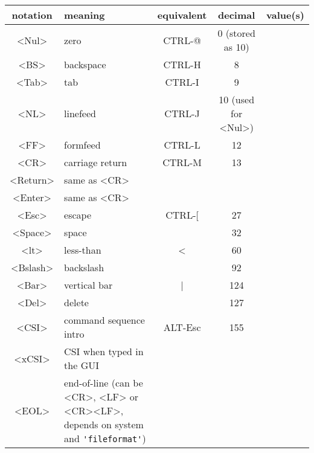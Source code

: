 \begin{description}
\begin{tabularx}{\textwidth}{|c|X|c|c|c|} %
				\hline
				notation & meaning                   & equivalent & decimal             & value(s)\\ \hline
				<Nul>    & zero                      & CTRL-@     & 0 (stored as 10)    & \label{<Nul>}\\
				<BS>     & backspace                 & CTRL-H     & 8                   & \label{backspace}\\
				<Tab>    & tab                       & CTRL-I     & 9                   & \label{tab} \label{Tab}\\
				<NL>     & linefeed                  & CTRL-J     & 10 (used for <Nul>) & \label{linefeed}\\
				<FF>     & formfeed                  & CTRL-L     & 12                  & \label{formfeed}\\
				<CR>     & carriage return           & CTRL-M     & 13                  & \label{carriage-return}\\
				<Return> & same as <CR>              &            &                     & \label{<Return>}\\
				<Enter>  & same as <CR>              &            &                     & \label{<Enter>}\\
				<Esc>    & escape                    & CTRL-[     & 27                  & \label{escape} \label{<Esc>}\\
				<Space>  & space                     &            & 32                  & \label{space}\\
				<lt>     & less-than                 & <          & 60                  & \label{<lt>}\\
				<Bslash> & backslash                 & \          & 92                  & \label{backslash} \label{<Bslash>}\\
				<Bar>    & vertical bar              & |          & 124                 & \label{<Bar>}\\
				<Del>    & delete                    &            & 127\\
				<CSI>    & command sequence intro    & ALT-Esc    & 155                 & \label{<CSI>}\\
				<xCSI>   & CSI when typed in the GUI &            &                     & \label{<xCSI>}\\

				<EOL> & end-of-line (can be <CR>, <LF> or <CR><LF>, depends on system and \verb!'fileformat'!) & & & \label{<EOL>}\\ %


\end{tabularx}
\end{description}
